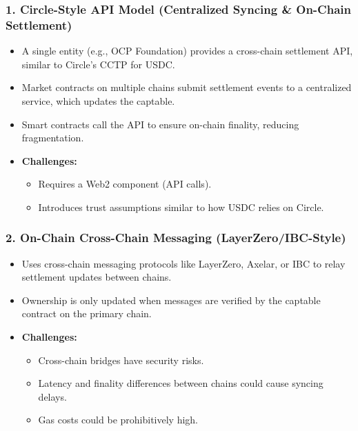 \documentclass[11pt,a4paper]{article}
\begin{document}
\subsubsection{1. Circle-Style API Model (Centralized Syncing \& On-Chain Settlement)}
\begin{itemize}
    \item A single entity (e.g., OCP Foundation) provides a cross-chain settlement API, similar to Circle's CCTP for USDC.
    \item Market contracts on multiple chains submit settlement events to a centralized service, which updates the captable.
    \item Smart contracts call the API to ensure on-chain finality, reducing fragmentation.
    \item \textbf{Challenges:}
    \begin{itemize}
        \item Requires a Web2 component (API calls).
        \item Introduces trust assumptions similar to how USDC relies on Circle.
    \end{itemize}
\end{itemize}

\subsubsection{2. On-Chain Cross-Chain Messaging (LayerZero/IBC-Style)}
\begin{itemize}
    \item Uses cross-chain messaging protocols like LayerZero, Axelar, or IBC to relay settlement updates between chains.
    \item Ownership is only updated when messages are verified by the captable contract on the primary chain.
    \item \textbf{Challenges:}
    \begin{itemize}
        \item Cross-chain bridges have security risks.
        \item Latency and finality differences between chains could cause syncing delays.
        \item Gas costs could be prohibitively high.
    \end{itemize}
\end{itemize}
\end{document}
